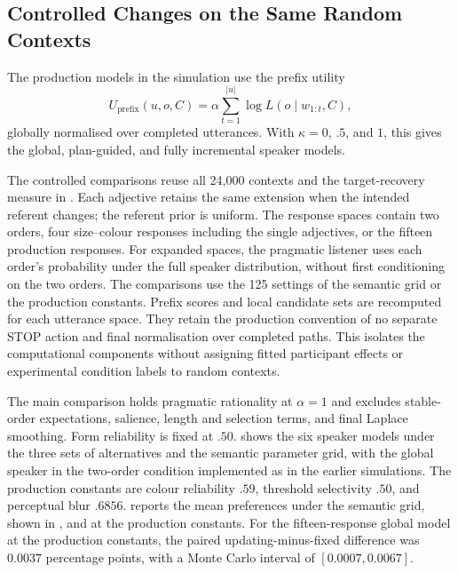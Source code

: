 \documentclass[10pt,a4paper,fleqn]{article}
\begin{document}
\subsection{Controlled Changes on the Same Random Contexts}
\label{sec:appendix:controlled-simulation}

The production models in the simulation use the prefix utility
\begin{equation}
 U_{\mathrm{prefix}}(u,o,C)=\alpha\sum_{t=1}^{|u|}\log L(o\mid w_{1:t},C),
 \label{eq:simulation-evaluation}
\end{equation}
globally normalised over completed utterances.
With $\kappa=0$, $.5$, and $1$, this gives the global, plan-guided, and fully incremental speaker models.

The controlled comparisons reuse all 24{,}000 contexts and the target-recovery measure in .
Each adjective retains the same extension when the intended referent changes; the referent prior is uniform.
The response spaces contain two orders, four size--colour responses including the single adjectives, or the fifteen production responses.
For expanded spaces, the pragmatic listener uses each order's probability under the full speaker distribution, without first conditioning on the two orders.
The comparisons use the 125 settings of the semantic grid or the production constants.
Prefix scores and local candidate sets are recomputed for each utterance space.
They retain the production convention of no separate STOP action and final normalisation over completed paths.
This isolates the computational components without assigning fitted participant effects or experimental condition labels to random contexts.

The main comparison holds pragmatic rationality at $\alpha=1$ and excludes stable-order expectations, salience, length and selection terms, and final Laplace smoothing.
Form reliability is fixed at $.50$.
 shows the six speaker models under the three sets of alternatives and the semantic parameter grid, with the global speaker in the two-order condition implemented as in the earlier simulations.
The production constants are colour reliability $.59$, threshold selectivity $.50$, and perceptual blur $.6856$.
 reports the mean preferences under the semantic grid, shown in , and at the production constants.
For the fifteen-response global model at the production constants, the paired updating-minus-fixed difference was $0.0037$ percentage points, with a Monte Carlo interval of $[0.0007,0.0067]$.
\end{document}
